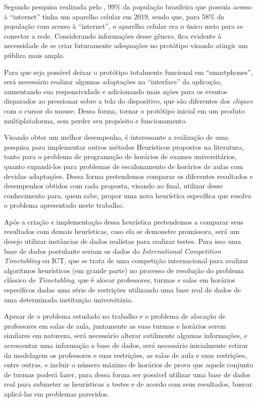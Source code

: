 
Segundo pesquisa realizada pelo , 99\% da população brasileira que possuía acesso à “internet” tinha um aparelho celular em 2019, sendo que, para 58\% da população com acesso à “internet”, o aparelho celular era o único meio para se conectar a rede. Considerando informações desse gênero, fica evidente à necessidade de se criar futuramente adequações no protótipo visando atingir um público mais amplo.

Para que seja possível deixar o protótipo totalmente funcional em “smartphones”, será necessário realizar algumas adaptações na “interface” da aplicação, aumentando sua responsividade e adicionando mais ações para os eventos disparados ao pressionar sobre a tela do dispositivo, que são diferentes dos \emph{cliques} com o cursor do mouse. Dessa forma, tornar o protótipo inicial em um produto multiplataforma, sem perder seu propósito e funcionamento.

Visando obter um melhor desempenho, é interessante a realização de uma pesquisa para implementar outros métodos Heurísticos propostos na literatura, tanto para o problema de programação de horários de exames universitários, quanto expandi-los para problemas de escalonamento de horários de aulas com devidas adaptações. Dessa forma pretendemos comparar os diferentes resultados e desempenhos obtidos com cada proposta, visando ao final, utilizar desse conhecimento para, quem sabe, propor uma nova heurística específica que resolva o problema apresentado neste trabalho.

 Após a criação e implementação dessa heurística pretendemos a comparar seus resultados com demais heurísticas, caso ela se demonstre promissora, será um desejo utilizar instâncias de dados realistas para realizar testes. Para isso uma base de dados postulante seriam os dados do \emph{International Competition Timetabling} ou ICT, que se trata de uma competição internacional para avalizar algoritmos heurísticos (em grande parte) no processo de resolução do problema clássico de \emph{Timetabling}, que é alocar professores, turmas e salas em horários específicos dadas uma série de restrições utilizando uma base real de dados de uma determinada instituição universitária.

Apesar de o problema estudado no trabalho e o problema de alocação de professores em salas de aula, juntamente as suas turmas e horários serem similares em natureza, será necessário alterar sutilmente algumas informações, e acrescentar uma informação a base de dados, será necessário inicialmente retirar da modelagem os professores e suas restrições, as salas de aula e suas restrições, entre outras, e incluir o número máximo de horários de prova que aquele conjunto de turmas poderá fazer, para dessa forma ser possível utilizar uma base de dados real para submeter as heurísticas a testes e de acordo com seus resultados, buscar aplicá-las em problemas parecidos.

